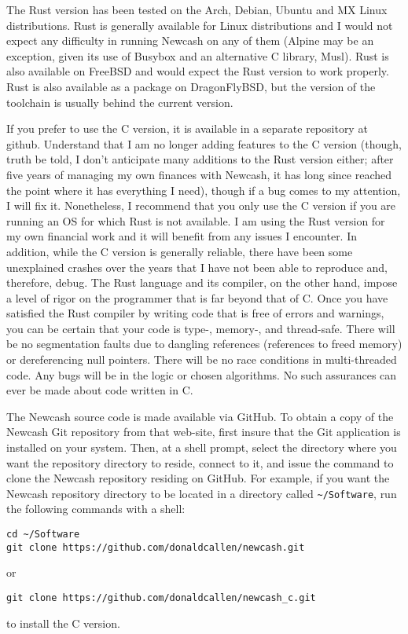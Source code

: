 \documentclass{report}
\begin{document}
The Rust version has been tested on the Arch, Debian, Ubuntu and MX Linux distributions. Rust is generally available for Linux distributions and I would not expect any difficulty in running Newcash on any of them (Alpine may be an exception, given its use
of Busybox and an alternative C library, Musl). Rust is also available on FreeBSD and would expect the Rust version to work properly. Rust is also available as a package on DragonFlyBSD, but the version of the toolchain is usually behind
the current version. 

If you prefer to use the C version, it is available in a separate repository at github. Understand that I am no longer adding features to the C version (though, truth be told, 
I don't anticipate many additions to the Rust version either; after five years of managing my own finances with Newcash, it has long since reached the point where it has everything
I need), though if a bug comes to my attention, I will fix it. Nonetheless, I recommend that you only use the C version if you are running an OS for which Rust is not available. I am using the Rust version for my own financial
work and it will benefit from any issues I encounter. In addition, while the C version is generally reliable, there have been some unexplained crashes over the years that I have not been able to reproduce and, therefore, debug.
The Rust language and its compiler, on the other hand, impose a level of rigor on the programmer that is far beyond that of C. Once you have satisfied the Rust compiler by writing code that is free of errors and warnings, you can be certain that your code is
type-, memory-, and thread-safe. There will be no segmentation faults due to dangling references (references to freed memory) or dereferencing null pointers. There will be no race conditions in multi-threaded code. Any bugs will be in the logic or chosen algorithms.  No such assurances can ever be made about code written in C.

The Newcash source code is made available via GitHub. To obtain a copy of the Newcash Git repository from that web-site, first insure that the Git application is installed on your system. 
Then, at a shell prompt, select the directory where you want the repository directory to reside, connect to it, and issue the command to clone the Newcash repository residing on GitHub. 
For example, if you want the Newcash repository directory to be located in a directory called \verb|~/Software|, run the following commands with a shell:
\begin{verbatim}
cd ~/Software
git clone https://github.com/donaldcallen/newcash.git
\end{verbatim}
or
\begin{verbatim}
git clone https://github.com/donaldcallen/newcash_c.git
\end{verbatim}
to install the C version.
\end{document}

